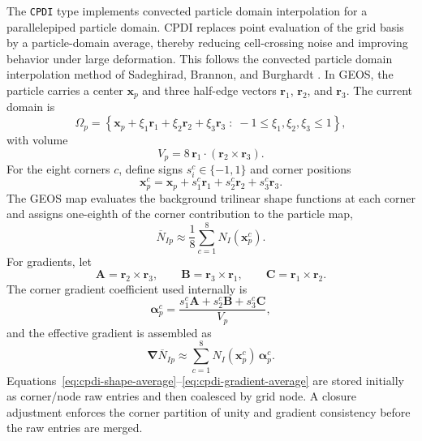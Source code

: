 The \texttt{CPDI} type implements convected particle domain interpolation for a parallelepiped particle domain.  CPDI replaces point evaluation of the grid basis by a particle-domain average, thereby reducing cell-crossing noise and improving behavior under large deformation.  This follows the convected particle domain interpolation method of Sadeghirad, Brannon, and Burghardt \cite{sadeghirad2011cpdi}.  In GEOS, the particle carries a center $\boldsymbol{x}_p$ and three half-edge vectors $\boldsymbol{r}_1$, $\boldsymbol{r}_2$, and $\boldsymbol{r}_3$.  The current domain is
\begin{equation}
  \Omega_p = \left\{
  \boldsymbol{x}_p+\xi_1\boldsymbol{r}_1+
  \xi_2\boldsymbol{r}_2+
  \xi_3\boldsymbol{r}_3
  \;:\;
  -1\le \xi_1,\xi_2,\xi_3\le 1
  \right\},
  \label{eq:cpdi-domain}
\end{equation}
with volume
\begin{equation}
  V_p = 8\,\boldsymbol{r}_1\cdot(\boldsymbol{r}_2\times\boldsymbol{r}_3).
  \label{eq:cpdi-volume}
\end{equation}
For the eight corners $c$, define signs $s^c_i\in\{-1,1\}$ and corner positions
\begin{equation}
  \boldsymbol{x}^c_p = \boldsymbol{x}_p
   +s^c_1\boldsymbol{r}_1+s^c_2\boldsymbol{r}_2+s^c_3\boldsymbol{r}_3.
  \label{eq:cpdi-corners}
\end{equation}
The GEOS map evaluates the background trilinear shape functions at each corner and assigns one-eighth of the corner contribution to the particle map,
\begin{equation}
  \overline{N}_{Ip}
  \approx \frac{1}{8}\sum_{c=1}^{8} N_I(\boldsymbol{x}^c_p).
  \label{eq:cpdi-shape-average}
\end{equation}
For gradients, let
\begin{equation}
  \boldsymbol{A}=\boldsymbol{r}_2\times\boldsymbol{r}_3,
  \qquad
  \boldsymbol{B}=\boldsymbol{r}_3\times\boldsymbol{r}_1,
  \qquad
  \boldsymbol{C}=\boldsymbol{r}_1\times\boldsymbol{r}_2.
  \label{eq:cpdi-area-vectors}
\end{equation}
The corner gradient coefficient used internally is
\begin{equation}
  \boldsymbol{\alpha}^c_p
  =\frac{s^c_1\boldsymbol{A}+s^c_2\boldsymbol{B}+s^c_3\boldsymbol{C}}{V_p},
  \label{eq:cpdi-alpha}
\end{equation}
and the effective gradient is assembled as
\begin{equation}
  \boldsymbol{\nabla}\overline{N}_{Ip}
  \approx \sum_{c=1}^{8} N_I(\boldsymbol{x}^c_p)\,\boldsymbol{\alpha}^c_p.
  \label{eq:cpdi-gradient-average}
\end{equation}
Equations~\eqref{eq:cpdi-shape-average}--\eqref{eq:cpdi-gradient-average} are stored initially as corner/node raw entries and then coalesced by grid node.  A closure adjustment enforces the corner partition of unity and gradient consistency before the raw entries are merged.

